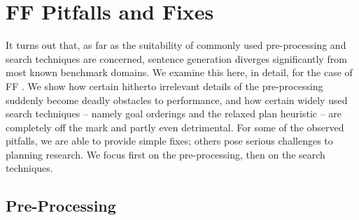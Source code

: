 




\section{FF Pitfalls and Fixes}
\label{sec:crisp-ff}




It turns out that, as far as the suitability of commonly used
pre-processing and search techniques are concerned, sentence
generation diverges significantly from most known benchmark
domains. We examine this here, in detail, for the case of FF
\cite{HoffmannNebel01}. We show how certain hitherto irrelevant
details of the pre-processing suddenly become deadly obstacles to
performance, and how certain widely used search techniques -- namely
goal orderings and the relaxed plan heuristic -- are completely off
the mark and partly even detrimental. For some of the observed
pitfalls, we are able to provide simple fixes; others pose serious
challenges to planning research. We focus first on the pre-processing,
then on the search techniques.













\subsection{Pre-Processing}
\label{sec:crisp-ff:preprocess}















